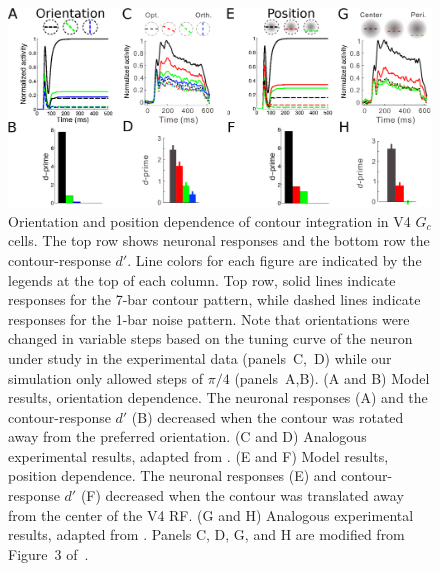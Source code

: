 \begin{figure}[h]
\begin{center}
\includegraphics[width=\textwidth]{Contour/figs/FigS1.eps}
\end{center}
\makeatletter
\let\@currsize\normalsize
\caption[Orientation and position dependence of contour integration in V4]{Orientation and position dependence of contour integration in
  V4 $G_c$ cells. The top row shows neuronal responses and the bottom
  row the contour-response $d'$.  Line colors for each figure are
  indicated by the legends at the top of each column. Top row, solid
  lines indicate responses for the 7-bar contour pattern, while dashed
  lines indicate responses for the 1-bar noise pattern.  Note that
  orientations were changed in variable steps based on the tuning
  curve of the neuron under study in the experimental data
  (panels~C,~D) while our simulation only allowed steps of
  $\pi/4$ (panels~A,B).  (A and B) Model results, orientation
  dependence.
 The neuronal responses (A) and the contour-response $d'$
  (B) decreased when the contour was rotated away from the preferred
  orientation. (C and D) Analogous experimental results, adapted from
  \cite{Chen_etal14}.
  (E and F) Model
  results, position dependence.
 The neuronal responses (E) and
  contour-response $d'$ (F) decreased when the contour was translated away from the center of the V4 RF.
  (G and H) Analogous experimental results, adapted from \cite{Chen_etal14}. Panels C, D, G, and H are modified from Figure~3 of~\cite{Chen_etal14}.}
\label{Fig:V4_total}
\end{figure}

\clearpage

